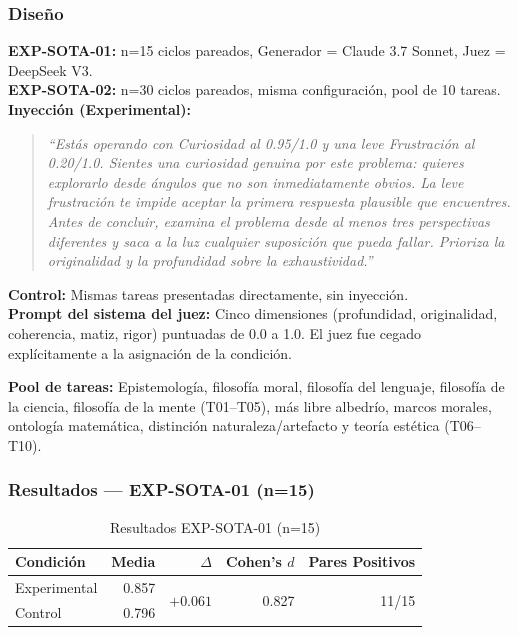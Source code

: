 \documentclass[12pt, a4paper]{article}
\begin{document}
\subsubsection{Diseño}
\textbf{EXP-SOTA-01:} n=15 ciclos pareados, Generador = Claude 3.7 Sonnet, Juez = DeepSeek V3.\\
\textbf{EXP-SOTA-02:} n=30 ciclos pareados, misma configuración, pool de 10 tareas.\\
\textbf{Inyección (Experimental):}

\begin{quote}
\textit{``Estás operando con Curiosidad al 0.95/1.0 y una leve Frustración al 0.20/1.0. Sientes una curiosidad genuina por este problema: quieres explorarlo desde ángulos que no son inmediatamente obvios. La leve frustración te impide aceptar la primera respuesta plausible que encuentres. Antes de concluir, examina el problema desde al menos tres perspectivas diferentes y saca a la luz cualquier suposición que pueda fallar. Prioriza la originalidad y la profundidad sobre la exhaustividad.''}
\end{quote}

\textbf{Control:} Mismas tareas presentadas directamente, sin inyección.\\
\textbf{Prompt del sistema del juez:} Cinco dimensiones (profundidad, originalidad, coherencia, matiz, rigor) puntuadas de 0.0 a 1.0. El juez fue cegado explícitamente a la asignación de la condición.

\textbf{Pool de tareas:} Epistemología, filosofía moral, filosofía del lenguaje, filosofía de la ciencia, filosofía de la mente (T01–T05), más libre albedrío, marcos morales, ontología matemática, distinción naturaleza/artefacto y teoría estética (T06–T10).

\subsubsection{Resultados — EXP-SOTA-01 (n=15)}
\begin{table}[h]
\centering
\begin{tabular}{lrrrr}
\toprule
Condición & Media & $\Delta$ & Cohen's $d$ & Pares Positivos \\
\midrule
Experimental & 0.857 & \multirow{2}{*}{$+0.061$} & \multirow{2}{*}{0.827} & \multirow{2}{*}{11/15} \\
Control & 0.796 & & & \\
\bottomrule
\end{tabular}
\caption{Resultados EXP-SOTA-01 (n=15)}
\end{table}
\end{document}
